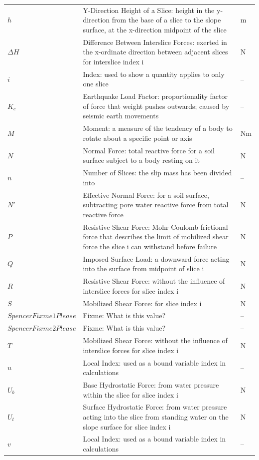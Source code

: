\documentclass[12pt]{article}
\begin{document}
\begin{longtabu}{l X[l] l}
\\
$h$ & Y-Direction Height of a Slice: height in the y-direction from the base of a slice to the slope surface, at the x-direction midpoint of the slice & m
\\
$ΔH$ & Difference Between Interslice Forces: exerted in the x-ordinate direction between adjacent slices for interslice index i & N
\\
$i$ & Index: used to show a quantity applies to only one slice & --
\\
${K_{c}}$ & Earthquake Load Factor: proportionality factor of force that weight pushes outwards; caused by seismic earth movements & --
\\
$M$ & Moment: a measure of the tendency of a body to rotate about a specific point or axis & Nm
\\
$N$ & Normal Force: total reactive force for a soil surface subject to a body resting on it & N
\\
$n$ & Number of Slices: the slip mass has been divided into & --
\\
$N'$ & Effective Normal Force: for a soil surface, subtracting pore water reactive force from total reactive force & N
\\
$P$ & Resistive Shear Force: Mohr Coulomb frictional force that describes the limit of mobilized shear force the slice i can withstand before failure & N
\\
$Q$ & Imposed Surface Load: a downward force acting into the surface from midpoint of slice i & N
\\
$R$ & Resistive Shear Force: without the influence of interslice forces for slice index i & N
\\
$S$ & Mobilized Shear Force: for slice index i & N
\\
$SpencerFixme1Please$ & Fixme: What is this value? & --
\\
$SpencerFixme2Please$ & Fixme: What is this value? & --
\\
$T$ & Mobilized Shear Force: without the influence of interslice forces for slice index i & N
\\
$u$ & Local Index: used as a bound variable index in calculations & --
\\
${U_{b}}$ & Base Hydrostatic Force: from water pressure within the slice for slice index i & N
\\
${U_{t}}$ & Surface Hydrostatic Force: from water pressure acting into the slice from standing water on the slope surface for slice index i & N
\\
$v$ & Local Index: used as a bound variable index in calculations & --

\end{longtabu}
\end{document}

